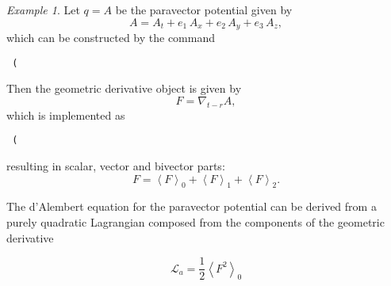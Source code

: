 \documentclass[twoside,reqno,11pt]{amsart}
\theoremstyle{definition}
\theoremstyle{remark}
\newtheorem*{ex}{Example}
\numberwithin{equation}{section}
\newcommand {\grpart}[1]{\ensuremath{\left\langle #1 \right\rangle  }}
\begin{document}
\begin{ex}
Let $q=A$ be the paravector potential given by
\begin{equation}\label{eq:parapot}
A = {{A}_{t}}+{{e}_{1}}\, {{A}_{x}}+{{e}_{2}} \, {{A}_{y}}+{{e}_{3}}\, {{A}_{z}},
\end{equation}
which can be constructed by the command
{\color{labelcolor}\begin{verbatim}
 (\end{verbatim}}
Then the geometric derivative object is given by
\begin{equation}
F = \nabla_{t-r} A,
\end{equation}
which is implemented as
{\color{labelcolor}\begin{verbatim}
 (\end{verbatim}}\noindent
resulting in scalar, vector and bivector parts:
\begin{equation}
F= \grpart{F}_0 +\grpart{F}_1 + \grpart{F}_2.
\end{equation}

The d'Alembert equation for the paravector potential can be derived from a  purely quadratic Lagrangian composed from the components of the geometric derivative

\begin{equation}
\mathcal{L}_a =  \frac{1}{2} \grpart{F^2 }_0
\end{equation}


\end{ex}
\end{document}

